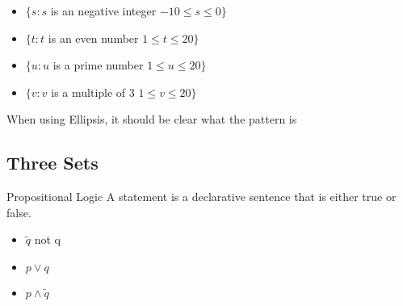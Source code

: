 {{{\begin{itemize} 
\item $\{ s : s $ is an negative integer $ -10 \leq s \leq 0 \}$
\item $\{ t : t $ is an even number $ 1 \leq t \leq 20 \}$
\item $\{ u : u $ is a prime number $ 1 \leq u \leq 20 \}$
\item $\{ v : v $ is a multiple of 3 $ 1 \leq v \leq 20 \}$
\end{itemize}








   





When using Ellipsis, it should be clear what the pattern is













\subsection*{ Three Sets }






Propositional Logic A statement is a declarative sentence that
is either true or false.
\begin{itemize}
\item $\tilde q$ not q \item $p \vee q$ \item $p \wedge \tilde
q$
\end{itemize}



}}}
